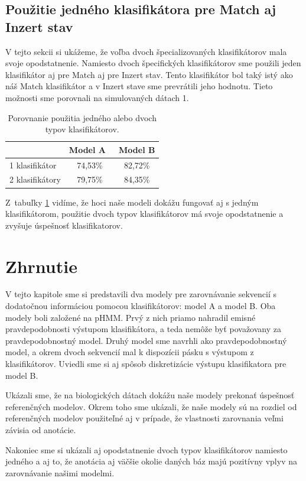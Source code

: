 \subsection{Použitie jedného klasifikátora pre Match aj Inzert stav}
V tejto sekcii si ukážeme, že voľba dvoch špecializovaných klasifikátorov mala svoje opodstatnenie. Namiesto dvoch špecifických klasifikátorov sme použili jeden klasifikátor aj pre Match aj pre Inzert stav. Tento klasifikátor bol taký istý ako náš Match klasifikátor a v Inzert stave sme prevrátili jeho hodnotu. Tieto možnosti sme porovnali na simulovaných dátach 1.

\begin{table}[htp]
\centering
\begin{tabular}{lcc}
\toprule
 & Model A~& Model B\\
\midrule
1 klasifikátor & 74,53\% & 82,72\%\\
2 klasifikátory & 79,75\% & 84,35\%\\
\bottomrule
\end{tabular}
\caption[Porovnanie použitia jedného alebo dvoch typov klasifikátorov]{Porovnanie použitia jedného alebo dvoch typov klasifikátorov.}
\label{tab:1clf-compare}
\end{table}

Z~tabuľky \ref{tab:1clf-compare} vidíme, že hoci naše modeli dokážu fungovať aj s jedným klasifikátorom, použitie dvoch typov klasifikátorov má svoje opodstatnenie a zvyšuje úspešnosť klasifikatorov.

\section{Zhrnutie}

V tejto kapitole sme si predstavili dva modely pre zarovnávanie sekvencií s dodatočnou informáciou pomocou klasifikátorov: model A a model B.
Oba modely boli založené na pHMM. Prvý z nich priamo nahradil emisné pravdepodobnosti výstupom klasifikátora, a teda nemôže byť považovany za pravdepodobnostný model.
Druhý model sme navrhli ako pravdepodobnostný model, a okrem dvoch sekvencií mal k dispozícii pásku s výstupom z klasifikátorov. Uviedli sme si aj spôsob diskretizácie výstupu klasifikatora pre model B.

Ukázali sme, že na biologických dátach dokážu naše modely prekonať úspešnosť referenčných modelov. Okrem toho sme ukázali, že naše modely sú na rozdiel od referenčných modelov použiteľné aj v prípade, že vlastnosti zarovnania veľmi závisia od anotácie.

Nakoniec sme si ukázali aj opodstatnenie dvoch typov klasifikátorov namiesto jedného a aj to, že anotácia aj väčšie okolie daných báz majú pozitívny vplyv na zarovnávanie našimi modelmi.
